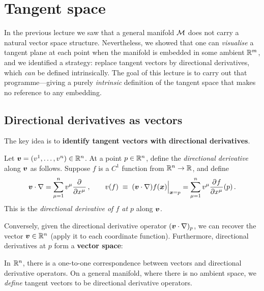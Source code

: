 
\section{Tangent space}\label{sec:tangent-space}

In the previous lecture we saw that a general manifold $\mathcal{M}$ does not
carry a natural vector space structure.  Nevertheless, we showed that
one can \emph{visualise} a tangent plane at each point when the
manifold is embedded in some ambient $\mathbb{R}^{m}$, and we identified a
strategy: replace tangent vectors by directional derivatives, which
\emph{can} be defined intrinsically.  The goal of this lecture is to
carry out that programme---giving a purely \emph{intrinsic} definition
of the tangent space that makes no reference to any embedding.

\subsection{Directional derivatives as vectors}\label{sec:dir-deriv}

The key idea is to \textbf{identify tangent vectors with directional
derivatives}.

Let $\boldsymbol{v} = (v^1,\dots,v^n)\in\mathbb{R}^{n}$.  At a point
$p\in\mathbb{R}^{n}$, define the \emph{directional derivative} along
$\boldsymbol{v}$ as follows.  Suppose $f$ is a $C^1$ function from
$\mathbb{R}^{n}\to\mathbb{R}$, and define
\begin{equation}\label{eq:dir-deriv-Rn}
  \boldsymbol{v}\cdot\nabla
    = \sum_{\mu=1}^{n} v^\mu \frac{\partial^{} }{\partial {{x^\mu}}^{}}\,,
  \qquad
  v(f) \;\equiv\; (\boldsymbol{v}\cdot\nabla) f(\boldsymbol{x})\Big|_{\boldsymbol{x}=p}
    = \sum_{\mu=1}^{n} v^\mu \frac{\partial^{} f}{\partial {x^\mu}^{}}(p)\,.
\end{equation}
This is the \emph{directional derivative of $f$ at $p$} along
$\boldsymbol{v}$.

Conversely, given the directional derivative operator
$(\boldsymbol{v}\cdot\nabla)_p$, we can recover the vector
$\boldsymbol{v}\in\mathbb{R}^{n}$ (apply it to each coordinate function).
Furthermore, directional derivatives at $p$ form a \textbf{vector
space}:

\begin{intuition}
  In $\mathbb{R}^{n}$, there is a one-to-one correspondence between vectors
  and directional derivative operators.  On a general manifold, where
  there is no ambient space, we \emph{define} tangent vectors to be
  directional derivative operators.
\end{intuition}

